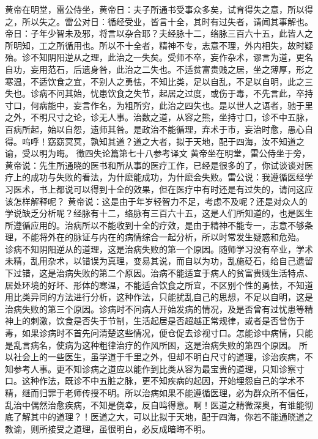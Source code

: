\documentclass[a4paper,12pt,UTF8,twoside]{ctexbook}
\begin{document}
黄帝在明堂，雷公侍坐，黄帝日：夫子所通书受事众多矣，试育得失之意，所以得之，所以失之。雷公对日：循经受业，皆言十全，其时有过失者，请闻其事解也。帝日：子年少智未及邪，将言以杂合耶？夫经脉十二，络脉三百六十五，此皆人之所明知，工之所循用也。所以不十全者，精神不专，志意不理，外内相失，故时疑殆。诊不知阴阳逆从之理，此治之一失矣。受师不卒，妄作杂术，谬言为道，更名自功，妄用范石，后遗身咎，此治之二失也。不适贫富贵贱之居，坐之薄厚，形之寒温，不适饮食之宜，不别人之勇怯，不知比类，足以自乱，不足以自明，此之三失也。诊病不问其始，忧患饮食之失节，起居之过度，或伤于毒，不先言此，卒持寸口，何病能中，妄言作名，为粗所穷，此治之四失也。是以世人之语者，驰于里之外，不明尺寸之论，诊无人事。治数之道，从容之熊，坐持寸口，诊不中五脉，百病所起，始以自怨，遗师其咎。是政治不能循理，弃术于市，妄治时愈，愚心自得。呜呼！窈窈冥冥，孰知其道？道之大者，拟于天地，配于四海，汝不知道之谕，受以明为晦。
徵四失论篇第七十八参考译文
黄帝坐在明堂，雷公侍坐于旁，黄帝说：先生所通晓的医书和所从事的医疗工作，已经是很多的了，你试谈谈对医疗上的成功与失败的看法，为什麽能成功，为什麽会失败。雷公说：我遵循医经学习医术，书上都说可以得到十全的效果，但在医疗中有时还是有过失的，请问这应该怎样解释呢？
黄帝说：这是由于年岁轻智力不足，考虑不及呢？还是对众人的学说缺乏分析呢？经脉有十二，络脉有三百六十五，这是人们所知道的，也是医生所遵循应用的。治病所以不能收到十全的疗效，是由于精神不能专一，志意不够条理，不能将外在的脉证与内在的病情综合一起分析，所以时常发生疑惑和危殆。
诊病不知阴阳逆从的道理，这是治病失败的第一个原因。随师学习没有卒业，学术未精，乱用杂术，以错误为真理，变易其说，而自以为功，乱施砭石，给自己遗留下过错，这是治病失败的第二个原因。治病不能适宜于病人的贫富贵贱生活特点、居处环境的好坏、形体的寒温，不能适合饮食之所宜，不区别个性的勇怯，不知道用比类异同的方法进行分析，这种作法，只能扰乱自己的思想，不足以自明，这是治病失败的第三个原因。诊病时不问病人开始发病的情况，及是否曾有过忧患等精神上的刺激，饮食是否失于节制，生活起居是否超越正常规律，或者是否曾伤于毒，如果诊病时不首先问清楚这些情况，便仓促去诊视寸口。怎能诊中病情，只能是乱言病名，使病为这种粗律治疗的作风所困，这是治病失败的第四个原因。
所以社会上的一些医生，虽学道于千里之外，但却不明白尺寸的道理，诊治疾病，不知参考人事。更不知诊病之道应以能作到比类从容为最宝贵的道理，只知诊察寸口。这种作法，既诊不中五脏之脉，更不知疾病的起因，开始埋怨自己的学术不精，继而归罪于老师传授不明。所以治病如果不能遵循医理，必为群众所不信任，乱治中偶然治愈疾病，不知是侥幸，反自鸣得意。啊！医道之精微深奥，有谁能彻底了解其中的道理？！医道之大，可以比拟于天地，配于四海，你若不能通晓道之教谕，则所接受之道理，虽很明白，必反成暗晦不明。

\part{}
\end{document}

